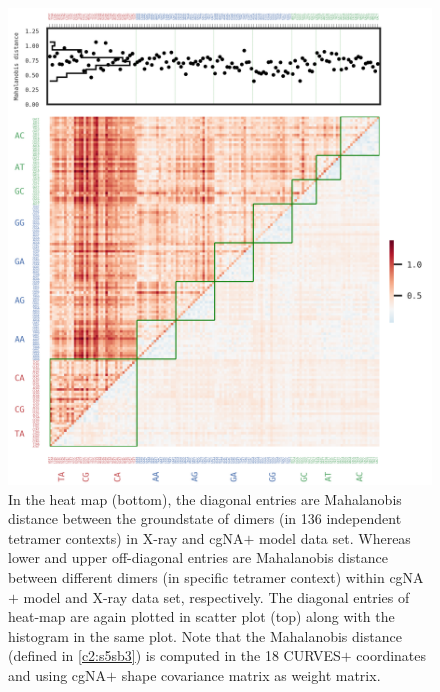 \begin{figure}[H]
	\begin{center}
	\includegraphics[scale=1.45]{./Xray_images/X2_heat_mahal_pca_18_comb.png}
	\caption{
	In the heat map (bottom), the diagonal entries are Mahalanobis distance between the groundstate of dimers (in 136 independent tetramer contexts) in X-ray and cgNA$+$ model data set. Whereas lower and upper off-diagonal entries are Mahalanobis distance between different dimers (in specific tetramer context) within cgNA$+$ model and X-ray data set, respectively. The diagonal entries of heat-map are again plotted in scatter plot (top) along with the histogram in the same plot.
	Note that the Mahalanobis distance (defined in \cref{c2:s5sb3}) is computed in the 18 CURVES$+$ coordinates and using cgNA$+$ shape covariance matrix as weight matrix. 
    }
\label{SIfig:Mahal_18}
\end{center}
\end{figure}

